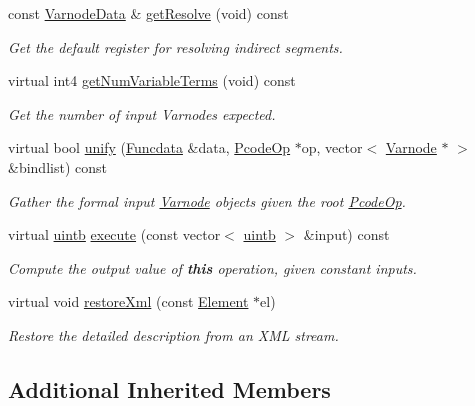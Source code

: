 \begin{DoxyCompactItemize}
const \mbox{\hyperlink{struct_varnode_data}{Varnode\+Data}} \& \mbox{\hyperlink{class_segment_op_aee22fbc6dec027b9cc041c65c9681068}{get\+Resolve}} (void) const
\begin{DoxyCompactList}\small\item\em Get the default register for resolving indirect segments. \end{DoxyCompactList}\item 
virtual int4 \mbox{\hyperlink{class_segment_op_a0a5b69caea8e60eaebe045f49c9351e1}{get\+Num\+Variable\+Terms}} (void) const
\begin{DoxyCompactList}\small\item\em Get the number of input Varnodes expected. \end{DoxyCompactList}\item 
virtual bool \mbox{\hyperlink{class_segment_op_acb25104d3aad5e44a3c9d5b471e39c48}{unify}} (\mbox{\hyperlink{class_funcdata}{Funcdata}} \&data, \mbox{\hyperlink{class_pcode_op}{Pcode\+Op}} $\ast$op, vector$<$ \mbox{\hyperlink{class_varnode}{Varnode}} $\ast$ $>$ \&bindlist) const
\begin{DoxyCompactList}\small\item\em Gather the formal input \mbox{\hyperlink{class_varnode}{Varnode}} objects given the root \mbox{\hyperlink{class_pcode_op}{Pcode\+Op}}. \end{DoxyCompactList}\item 
virtual \mbox{\hyperlink{types_8h_a2db313c5d32a12b01d26ac9b3bca178f}{uintb}} \mbox{\hyperlink{class_segment_op_a1857d8c2eef84b0a8c1bb7c624210c6c}{execute}} (const vector$<$ \mbox{\hyperlink{types_8h_a2db313c5d32a12b01d26ac9b3bca178f}{uintb}} $>$ \&input) const
\begin{DoxyCompactList}\small\item\em Compute the output value of {\bfseries{this}} operation, given constant inputs. \end{DoxyCompactList}\item 
virtual void \mbox{\hyperlink{class_segment_op_a6f311b351e8d30119469650d5e33f84b}{restore\+Xml}} (const \mbox{\hyperlink{class_element}{Element}} $\ast$el)
\begin{DoxyCompactList}\small\item\em Restore the detailed description from an X\+ML stream. \end{DoxyCompactList}\end{DoxyCompactItemize}
\subsection*{Additional Inherited Members}


